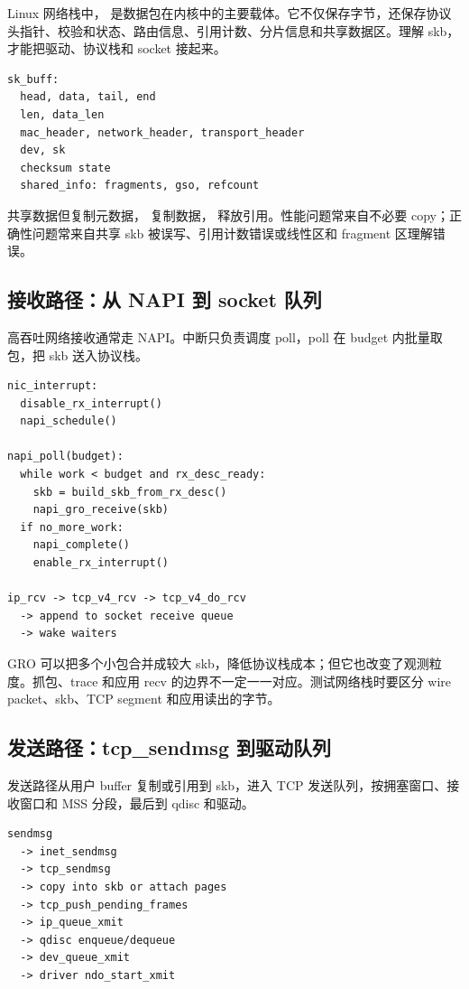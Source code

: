 Linux 网络栈中， 是数据包在内核中的主要载体。它不仅保存字节，还保存协议头指针、校验和状态、路由信息、引用计数、分片信息和共享数据区。理解 skb，才能把驱动、协议栈和 socket 接起来。

\begin{lstlisting}
sk_buff:
  head, data, tail, end
  len, data_len
  mac_header, network_header, transport_header
  dev, sk
  checksum state
  shared_info: fragments, gso, refcount
\end{lstlisting}

 共享数据但复制元数据， 复制数据， 释放引用。性能问题常来自不必要 copy；正确性问题常来自共享 skb 被误写、引用计数错误或线性区和 fragment 区理解错误。

\subsection{接收路径：从 NAPI 到 socket 队列}

高吞吐网络接收通常走 NAPI。中断只负责调度 poll，poll 在 budget 内批量取包，把 skb 送入协议栈。

\begin{lstlisting}
nic_interrupt:
  disable_rx_interrupt()
  napi_schedule()

napi_poll(budget):
  while work < budget and rx_desc_ready:
    skb = build_skb_from_rx_desc()
    napi_gro_receive(skb)
  if no_more_work:
    napi_complete()
    enable_rx_interrupt()

ip_rcv -> tcp_v4_rcv -> tcp_v4_do_rcv
  -> append to socket receive queue
  -> wake waiters
\end{lstlisting}

GRO 可以把多个小包合并成较大 skb，降低协议栈成本；但它也改变了观测粒度。抓包、trace 和应用 recv 的边界不一定一一对应。测试网络栈时要区分 wire packet、skb、TCP segment 和应用读出的字节。

\subsection{发送路径：tcp\_sendmsg 到驱动队列}

发送路径从用户 buffer 复制或引用到 skb，进入 TCP 发送队列，按拥塞窗口、接收窗口和 MSS 分段，最后到 qdisc 和驱动。

\begin{lstlisting}
sendmsg
  -> inet_sendmsg
  -> tcp_sendmsg
  -> copy into skb or attach pages
  -> tcp_push_pending_frames
  -> ip_queue_xmit
  -> qdisc enqueue/dequeue
  -> dev_queue_xmit
  -> driver ndo_start_xmit
\end{lstlisting}

